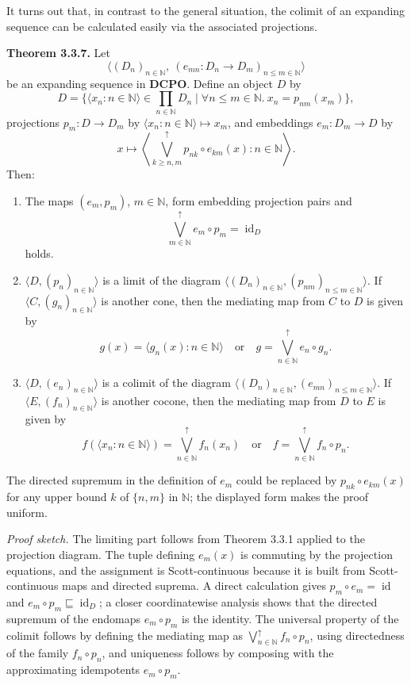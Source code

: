 \documentclass[11pt]{article}
\newcommand{\leanmarker}[2]{%
  \Needspace{3\baselineskip}%
  \marginnote{\hyperlink{#1}{\color{LeanTeal}\fbox{\scriptsize Lean}}}%
  \hypertarget{#1}{\textbf{#2.}}%
}
\begin{document}
It turns out that, in contrast to the general situation, the colimit of an expanding sequence can be calculated easily via the associated projections.

\leanmarker{thm-3-3-7}{Theorem 3.3.7} Let
\[
  \langle (D_n)_{n\in\mathbb{N}},\ (e_{mn}:D_n\to D_m)_{n\le m\in\mathbb{N}}\rangle
\]
be an expanding sequence in $\mathbf{DCPO}$. Define an object $D$ by
\[
  D=\{\langle x_n:n\in\mathbb{N}\rangle\in\prod_{n\in\mathbb{N}}D_n
      \mid \forall n\le m\in\mathbb{N}.\ x_n=p_{nm}(x_m)\},
\]
projections $p_m:D\to D_m$ by $\langle x_n:n\in\mathbb{N}\rangle\mapsto x_m$, and embeddings $e_m:D_m\to D$ by
\[
  x\mapsto \left\langle \bigvee^{\uparrow}_{k\ge n,m} p_{nk}\circ e_{km}(x):n\in\mathbb{N}\right\rangle.
\]
Then:
\begin{enumerate}
\item The maps $(e_m,p_m)$, $m\in\mathbb{N}$, form embedding projection pairs and
\[
  \bigvee^{\uparrow}_{m\in\mathbb{N}} e_m\circ p_m=\operatorname{id}_D
\]
holds.
\item $\langle D,(p_n)_{n\in\mathbb{N}}\rangle$ is a limit of the diagram $\langle(D_n)_{n\in\mathbb{N}},(p_{nm})_{n\le m\in\mathbb{N}}\rangle$. If $\langle C,(g_n)_{n\in\mathbb{N}}\rangle$ is another cone, then the mediating map from $C$ to $D$ is given by
\[
  g(x)=\langle g_n(x):n\in\mathbb{N}\rangle
  \quad\text{or}\quad
  g=\bigvee^{\uparrow}_{n\in\mathbb{N}} e_n\circ g_n.
\]
\item $\langle D,(e_n)_{n\in\mathbb{N}}\rangle$ is a colimit of the diagram $\langle(D_n)_{n\in\mathbb{N}},(e_{mn})_{n\le m\in\mathbb{N}}\rangle$. If $\langle E,(f_n)_{n\in\mathbb{N}}\rangle$ is another cocone, then the mediating map from $D$ to $E$ is given by
\[
  f(\langle x_n:n\in\mathbb{N}\rangle)=\bigvee^{\uparrow}_{n\in\mathbb{N}}f_n(x_n)
  \quad\text{or}\quad
  f=\bigvee^{\uparrow}_{n\in\mathbb{N}}f_n\circ p_n.
\]
\end{enumerate}
The directed supremum in the definition of $e_m$ could be replaced by $p_{nk}\circ e_{km}(x)$ for any upper bound $k$ of $\{n,m\}$ in $\mathbb{N}$; the displayed form makes the proof uniform.

\emph{Proof sketch.} The limiting part follows from Theorem 3.3.1 applied to the projection diagram. The tuple defining $e_m(x)$ is commuting by the projection equations, and the assignment is Scott-continuous because it is built from Scott-continuous maps and directed suprema. A direct calculation gives $p_m\circ e_m=\operatorname{id}$ and $e_m\circ p_m\sqsubseteq\operatorname{id}_D$; a closer coordinatewise analysis shows that the directed supremum of the endomaps $e_m\circ p_m$ is the identity. The universal property of the colimit follows by defining the mediating map as $\bigvee^{\uparrow}_{n\in\mathbb{N}}f_n\circ p_n$, using directedness of the family $f_n\circ p_n$, and uniqueness follows by composing with the approximating idempotents $e_m\circ p_m$.
\end{document}

